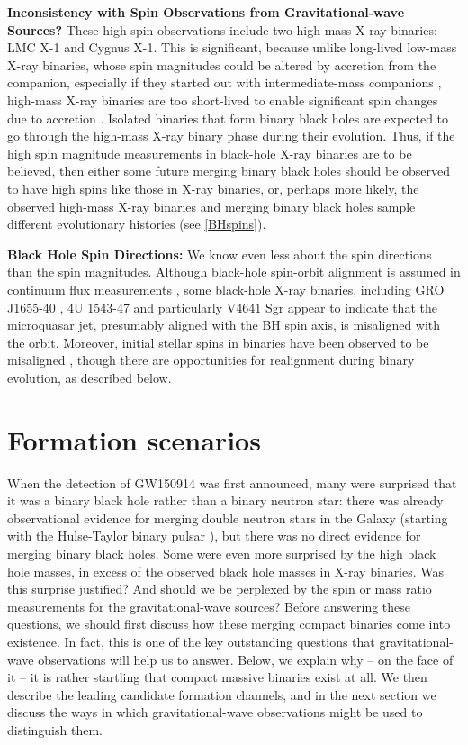 \documentclass[iop,onecolumn]{revtex4-1}
\begin{document}
\textbf{Inconsistency with Spin Observations from Gravitational-wave Sources?} These high-spin observations include two high-mass X-ray binaries: LMC X-1 and Cygnus X-1.  This is significant, because unlike long-lived low-mass X-ray binaries, whose spin magnitudes could be altered by accretion from the companion, especially if they started out with intermediate-mass companions \citep{Podsiadlowski:2003,Fragos:2015}, high-mass X-ray binaries are too short-lived to enable significant spin changes due to accretion \citep{KingKolb:1999}.  Isolated binaries that form binary black holes are expected to go through the high-mass X-ray binary phase during their evolution.  Thus, if the high spin magnitude measurements in black-hole X-ray binaries are to be believed, then either some future merging binary black holes should be observed to have high spins like those in X-ray binaries, or, perhaps more likely, the observed high-mass X-ray binaries and merging binary black holes sample different evolutionary histories (see \autoref{BHspins}).

\textbf{Black Hole Spin Directions:} We know even less about the spin directions than the spin magnitudes.  Although black-hole spin-orbit alignment is assumed in continuum flux measurements \citep{MillerMiller:2015}, some black-hole X-ray binaries, including GRO J1655-40 \citep{Martin:2008}, 4U 1543-47 \citep{MorningstarMiller:2014} and particularly V4641 Sgr \citep{Orosz:2001,Martin:2008b} appear to indicate that the microquasar jet, presumably aligned with the BH spin axis, is misaligned with the orbit.  Moreover, initial stellar spins in binaries have been observed to be misaligned \citep[e.g.,][]{Albrecht:2009,Albrecht:2014}, though there are opportunities for realignment during binary evolution, as described below.

\section{Formation scenarios}\label{form}

When the detection of GW150914 was first announced, many were surprised that it was a binary black hole rather than a binary neutron star: there was already observational evidence for merging double neutron stars in the Galaxy (starting with the Hulse-Taylor binary pulsar \citep{HulseTaylor:1975}), but there was no direct evidence for merging binary black holes. Some were even more surprised by the high black hole masses, in excess of the observed black hole masses in X-ray binaries. Was this surprise justified? And should we be perplexed by the spin or mass ratio measurements for the gravitational-wave sources? Before answering these questions, we should first discuss how these merging compact binaries come into existence. In fact, this is one of the key outstanding questions that gravitational-wave observations will help us to answer. Below, we explain why -- on the face of it -- it is rather startling that compact massive binaries exist at all. We then describe the leading candidate formation channels, and in the next section we discuss the ways in which gravitational-wave observations might be used to distinguish them.
\end{document}

